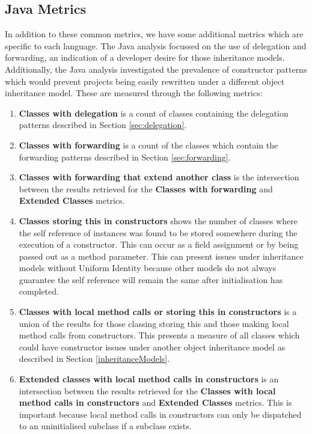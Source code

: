 \subsection{Java Metrics}
In addition to these common metrics, we have some additional metrics which are specific to each language. The Java analysis focussed on the use of delegation and forwarding, an indication of a developer desire for those inheritance models. Additionally, the Java analysis investigated the prevalence of constructor patterns which would prevent projects being easily rewritten under a different object inheritance model. These are measured through the following metrics:
\begin{enumerate}
	\item \textbf{Classes with delegation} is a count of classes containing the delegation patterns described in Section \ref{sec:delegation}.
	
	\item \textbf{Classes with forwarding} is a count of the classes which contain the forwarding patterns described in Section \ref{sec:forwarding}.
	
	\item \textbf{Classes with forwarding that extend another class} is the intersection between the results retrieved for the \textbf{Classes with forwarding} and \textbf{Extended Classes} metrics.
	
	\item \textbf{Classes storing this in constructors} shows the number of classes where the self reference of instances was found to be stored somewhere during the execution of a constructor. This can occur as a field assignment or by being passed out as a method parameter. This can present issues under inheritance models without Uniform Identity because other models do not always guarantee the self reference will remain the same after initialisation has completed.
	
	\item \textbf{Classes with local method calls or storing this in constructors} is a union of the results for those classing storing this and those making local method calls from constructors. This presents a measure of all classes which could have constructor issues under another object inheritance model as described in Section \ref{inheritanceModels}.
	
	\item \textbf{Extended classes with local method calls in constructors} is an intersection between the results retrieved for the \textbf{Classes with local method calls in constructors} and \textbf{Extended Classes} metrics. This is important because local method calls in constructors can only be dispatched to an uninitialised subclass if a subclass exists.
	

\end{enumerate}
